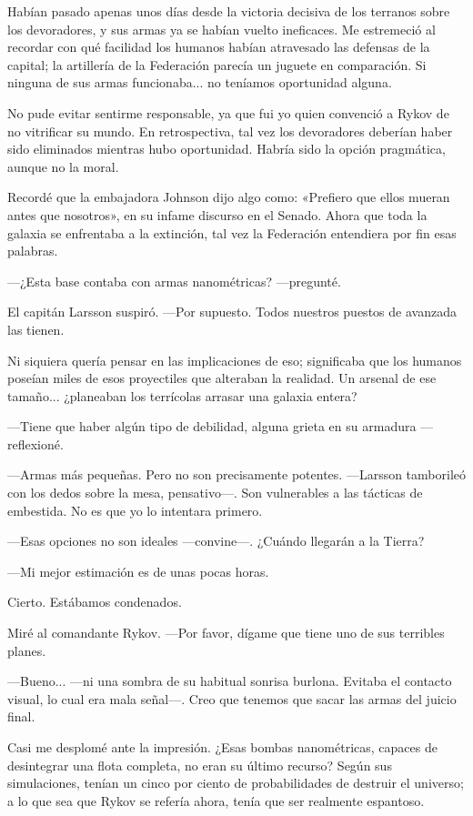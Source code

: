 Habían pasado apenas unos días desde la victoria decisiva de los terranos sobre los devoradores, y sus armas ya se habían vuelto ineficaces. Me estremeció al recordar con qué facilidad los humanos habían atravesado las defensas de la capital; la artillería de la Federación parecía un juguete en comparación. Si ninguna de sus armas funcionaba... no teníamos oportunidad alguna.

No pude evitar sentirme responsable, ya que fui yo quien convenció a Rykov de no vitrificar su mundo. En retrospectiva, tal vez los devoradores deberían haber sido eliminados mientras hubo oportunidad. Habría sido la opción pragmática, aunque no la moral.

Recordé que la embajadora Johnson dijo algo como: «Prefiero que ellos mueran antes que nosotros», en su infame discurso en el Senado. Ahora que toda la galaxia se enfrentaba a la extinción, tal vez la Federación entendiera por fin esas palabras.

 —¿Esta base contaba con armas nanométricas? —pregunté.

El capitán Larsson suspiró. —Por supuesto. Todos nuestros puestos de avanzada las tienen.

Ni siquiera quería pensar en las implicaciones de eso; significaba que los humanos poseían miles de esos proyectiles que alteraban la realidad. Un arsenal de ese tamaño... ¿planeaban los terrícolas arrasar una galaxia entera?

—Tiene que haber algún tipo de debilidad, alguna grieta en su armadura —reflexioné.

—Armas más pequeñas. Pero no son precisamente potentes. —Larsson tamborileó con los dedos sobre la mesa, pensativo—. Son vulnerables a las tácticas de embestida. No es que yo lo intentara primero.

—Esas opciones no son ideales —convine—. ¿Cuándo llegarán a la Tierra?

—Mi mejor estimación es de unas pocas horas.

Cierto. Estábamos condenados.

Miré al comandante Rykov. —Por favor, dígame que tiene uno de sus terribles planes.

—Bueno... —ni una sombra de su habitual sonrisa burlona. Evitaba el contacto visual, lo cual era mala señal—. Creo que tenemos que sacar las armas del juicio final.

Casi me desplomé ante la impresión. ¿Esas bombas nanométricas, capaces de desintegrar una flota completa, no eran su último recurso? Según sus simulaciones, tenían un cinco por ciento de probabilidades de destruir el universo; a lo que sea que Rykov se refería ahora, tenía que ser realmente espantoso.

